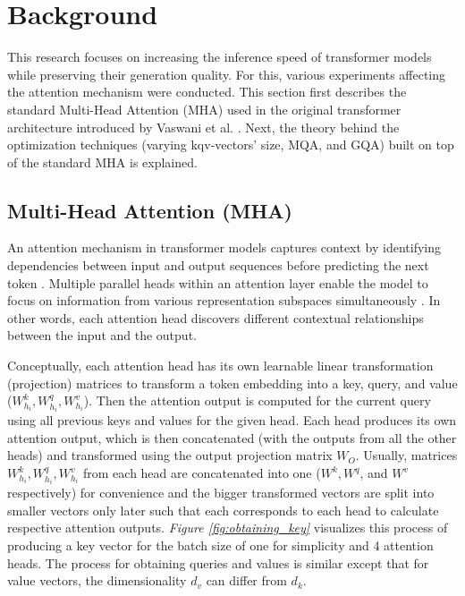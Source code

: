 \section{Background}
This research focuses on increasing the inference speed of transformer models while preserving their generation quality. For this, various experiments affecting the attention mechanism were conducted. This section first describes the standard Multi-Head Attention (MHA) used in the original transformer architecture introduced by Vaswani et al. \cite{vaswani_attention_2017}. Next, the theory behind the optimization techniques (varying kqv-vectors' size, MQA, and GQA) built on top of the standard MHA is explained.

\subsection{Multi-Head Attention (MHA)}
An attention mechanism in transformer models captures context by identifying dependencies between input and output sequences before predicting the next token \cite{vaswani_attention_2017}. Multiple parallel heads within an attention layer enable the model to focus on information from various representation subspaces simultaneously \cite{vaswani_attention_2017}. In other words, each attention head discovers different contextual relationships between the input and the output.

Conceptually, each attention head has its own learnable linear transformation (projection) matrices to transform a token embedding into a key, query, and value ($W_{h_{i}}^{k}, W_{h_{i}}^{q}, W_{h_{i}}^{v}$). Then the attention output is computed for the current query using all previous keys and values for the given head. Each head produces its own attention output, which is then concatenated (with the outputs from all the other heads) and transformed using the output projection matrix $W_O$. Usually, matrices $W_{h_{i}}^{k}, W_{h_{i}}^{q}, W_{h_{i}}^{v}$ from each head are concatenated into one ($W^{k}, W^{q}$, and $W^{v}$ respectively) for convenience and the bigger transformed vectors are split into smaller vectors only later such that each corresponds to each head to calculate respective attention outputs. \textit{Figure \ref{fig:obtaining_key}} visualizes this process of producing a key vector for the batch size of one for simplicity and 4 attention heads. The process for obtaining queries and values is similar except that for value vectors, the dimensionality $d_v$ can differ from $d_k$.

